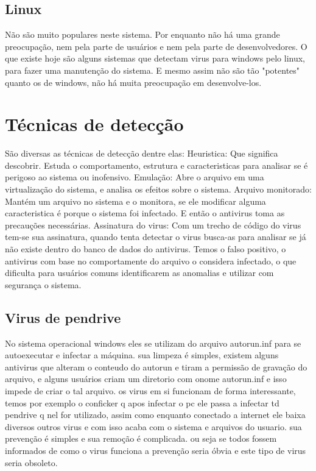 \subsection{Linux}
Não são muito populares neste sistema. Por enquanto não há uma grande preocupação, nem pela parte de usuários e nem pela parte de desenvolvedores. O que existe hoje são alguns sistemas que detectam virus para windows pelo linux, para fazer uma manutenção do sistema. E mesmo assim não são tão "potentes" quanto os de windows, não há muita preocupação em desenvolve-los.


\section{Técnicas de detecção}
São diversas as técnicas de detecção dentre elas:
Heuristica: Que significa descobrir. Estuda o comportamento, estrutura e caracteristicas para analisar se é perigoso ao sistema ou inofensivo.
Emulação: Abre o arquivo em uma virtualização do sistema, e analisa os efeitos sobre o sistema.
Arquivo monitorado: Mantém um arquivo no sistema e o monitora, se ele modificar alguma caracteristica é porque o sistema foi infectado. E então o antivirus toma as precauções necessárias.
Assinatura do virus: Com um trecho de código do virus tem-se sua assinatura, quando tenta detectar o virus busca-as para analisar se já não existe dentro do banco de dados do antivirus.
Temos o falso positivo, o antivirus com base no comportamente do arquivo o considera infectado, o que dificulta para usuários comuns identificarem as anomalias e utilizar com segurança o sistema.

\subsection{Virus de pendrive}
No sistema operacional windows eles se utilizam do arquivo autorun.inf para se autoexecutar e infectar a máquina. sua limpeza é simples, existem alguns antivirus que alteram o conteudo do autorun e tiram a permissão de gravação do arquivo, e alguns usuários criam um diretorio com onome autorun.inf e isso impede de criar o tal arquivo. os virus em si funcionam de forma interessante, temos por exemplo o conficker q apos infectar o pc ele passa a infectar td pendrive q nel for utilizado, assim como enquanto conectado a internet ele baixa diversos outros virus e com isso acaba com o sistema e arquivos do usuario. sua prevenção é simples e sua remoção é complicada. ou seja se todos fossem informados de como o virus funciona a prevenção seria óbvia e este tipo de virus seria obsoleto.

